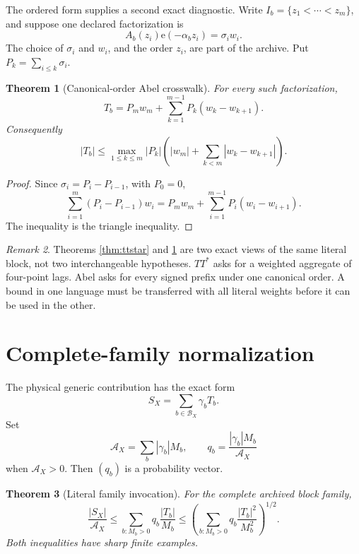 \documentclass[11pt]{article}
\newtheorem{theorem}{Theorem}[section]
\theoremstyle{definition}
\theoremstyle{remark}
\newtheorem{remark}[theorem]{Remark}
\newcommand{\e}{\mathrm e}
\begin{document}
The ordered form supplies a second exact diagnostic.  Write
\(I_b=\{z_1<\cdots<z_m\}\), and suppose one declared factorization is
\[
 A_b(z_i)\e(-\alpha_bz_i)=\sigma_iw_i.
\]
The choice of \(\sigma_i\) and \(w_i\), and the order \(z_i\), are
part of the archive.  Put \(P_k=\sum_{i\le k}\sigma_i\).

\begin{theorem}[Canonical-order Abel crosswalk]
\label{thm:abel}
For every such factorization,
\begin{equation}
 T_b=P_mw_m+\sum_{k=1}^{m-1}P_k(w_k-w_{k+1}).
 \label{eq:abel}
\end{equation}
Consequently
\[
 |T_b|
 \le
 \max_{1\le k\le m}|P_k|
 \left(
 |w_m|+\sum_{k<m}|w_k-w_{k+1}|
 \right).
\]
\end{theorem}

\begin{proof}
Since \(\sigma_i=P_i-P_{i-1}\), with \(P_0=0\),
\[
 \sum_{i=1}^m(P_i-P_{i-1})w_i
 =P_mw_m+\sum_{i=1}^{m-1}P_i(w_i-w_{i+1}).
\]
The inequality is the triangle inequality.
\end{proof}

\begin{remark}
Theorems \ref{thm:ttstar} and \ref{thm:abel} are two exact views of
the same literal block, not two interchangeable hypotheses.
\(TT^*\) asks for a weighted aggregate of four-point lags.  Abel
asks for every signed prefix under one canonical order.  A bound in
one language must be transferred with all literal weights before it
can be used in the other.
\end{remark}

\section{Complete-family normalization}

The physical generic contribution has the exact form
\begin{equation}
 S_X=\sum_{b\in\mathcal B_X}\gamma_bT_b.
 \label{eq:family}
\end{equation}
Set
\[
 \mathcal A_X=\sum_b|\gamma_b|M_b,\qquad
 q_b=\frac{|\gamma_b|M_b}{\mathcal A_X}
\]
when \(\mathcal A_X>0\).  Then \((q_b)\) is a probability vector.

\begin{theorem}[Literal family invocation]
\label{thm:family}
For the complete archived block family,
\begin{equation}
 \frac{|S_X|}{\mathcal A_X}
 \le
 \sum_{b:M_b>0}q_b\frac{|T_b|}{M_b}
 \le
 \left(
 \sum_{b:M_b>0}
 q_b\frac{|T_b|^2}{M_b^2}
 \right)^{1/2}.
 \label{eq:family-bound}
\end{equation}
Both inequalities have sharp finite examples.
\end{theorem}
\end{document}

